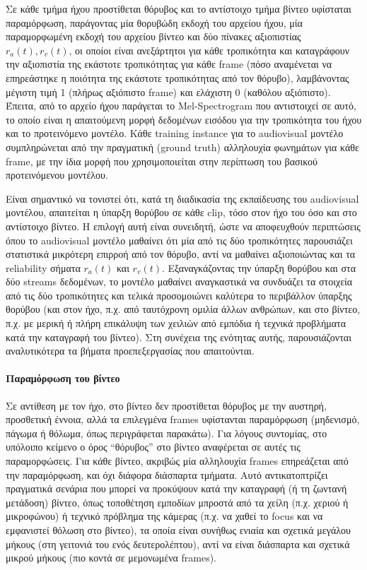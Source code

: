 Σε κάθε τμήμα ήχου προστίθεται θόρυβος και το αντίστοιχο τμήμα βίντεο υφίσταται παραμόρφωση, παράγοντας μία θορυβώδη εκδοχή του αρχείου ήχου, μία παραμορφωμένη εκδοχή του αρχείου βίντεο και δύο πίνακες αξιοπιστίας $r_a(t), r_v(t)$, οι οποίοι είναι ανεξάρτητοι για κάθε τροπικότητα και καταγράφουν την αξιοπιστία της εκάστοτε τροπικότητας για κάθε frame (πόσο αναμένεται να επηρεάστηκε η ποιότητα της εκάστοτε τροπικότητας από τον θόρυβο), λαμβάνοντας μέγιστη τιμή 1 (πλήρως αξιόπιστο frame) και ελάχιστη 0 (καθόλου αξιόπιστο). Έπειτα, από το αρχείο ήχου παράγεται το Mel-Spectrogram που αντιστοιχεί σε αυτό, το οποίο είναι η απαιτούμενη μορφή δεδομένων εισόδου για την τροπικότητα του ήχου και το προτεινόμενο μοντέλο.  Κάθε training instance για το audiovisual μοντέλο συμπληρώνεται από την πραγματική (ground truth) αλληλουχία φωνημάτων για κάθε frame, με την ίδια μορφή που χρησιμοποιείται στην περίπτωση του βασικού προτεινόμενου μοντέλου.

Είναι σημαντικό να τονιστεί ότι, κατά τη διαδικασία της εκπαίδευσης του audiovisual μοντέλου, απαιτείται η ύπαρξη θορύβου σε κάθε clip, τόσο στον ήχο του όσο και στο αντίστοιχο βίντεο. Η επιλογή αυτή είναι συνειδητή, ώστε να αποφευχθούν περιπτώσεις όπου το audiovisual μοντέλο μαθαίνει ότι μία από τις δύο τροπικότητες παρουσιάζει στατιστικά μικρότερη επιρροή από τον θόρυβο, αντί να μαθαίνει αξιοποιώντας και τα reliability σήματα $r_a(t)$ και $r_v(t)$. Εξαναγκάζοντας την ύπαρξη θορύβου και στα δύο streams δεδομένων, το μοντέλο μαθαίνει αναγκαστικά να συνδυάζει τα στοιχεία από τις δύο τροπικότητες και τελικά προσομοιώνει καλύτερα το περιβάλλον ύπαρξης θορύβου (και στον ήχο, π.χ. από ταυτόχρονη ομιλία άλλων ανθρώπων, και στο βίντεο, π.χ. με μερική ή πλήρη επικάλυψη των χειλιών από εμπόδια ή τεχνικά προβλήματα κατά την καταγραφή του βίντεο). Στη συνέχεια της ενότητας αυτής, παρουσιάζονται αναλυτικότερα τα βήματα προεπεξεργασίας που απαιτούνται.

\paragraph{Παραμόρφωση του βίντεο}

Σε αντίθεση με τον ήχο, στο βίντεο δεν προστίθεται θόρυβος με την αυστηρή, προσθετική έννοια, αλλά τα επιλεγμένα frames υφίστανται παραμόρφωση (μηδενισμό, πάγωμα ή θόλωμα, όπως περιγράφεται παρακάτω). Για λόγους συντομίας, στο υπόλοιπο κείμενο ο όρος ``θόρυβος'' στο βίντεο αναφέρεται σε αυτές τις παραμορφώσεις. Για κάθε βίντεο, ακριβώς μία αλληλουχία frames επηρεάζεται από την παραμόρφωση, και όχι διάφορα διάσπαρτα τμήματα. Αυτό αντικατοπτρίζει πραγματικά σενάρια που μπορεί να προκύψουν κατά την καταγραφή (ή τη ζωντανή μετάδοση) βίντεο, όπως τοποθέτηση εμποδίων μπροστά από τα χείλη (π.χ. χεριού ή μικροφώνου) ή τεχνικό πρόβλημα της κάμερας (π.χ. να χαθεί το focus και να εμφανιστεί θόλωση στο βίντεο), τα οποία είναι συνήθως ενιαία και σχετικά μεγάλου μήκους (στη γειτονιά του ενός δευτερολέπτου), αντί να είναι διάσπαρτα και σχετικά μικρού μήκους (πιο κοντά σε μεμονωμένα frames).

